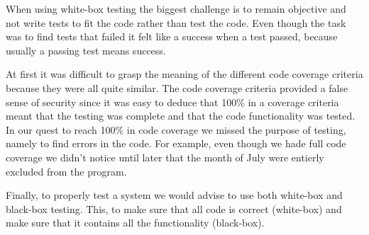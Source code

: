 When using white-box testing the biggest challenge is to remain objective and not write tests to fit the code rather than test the code. Even though the task was to find tests that failed it felt like a success when a test passed, because usually a passing test means success. 

At first it was difficult to grasp the meaning of the different code coverage criteria because they were all quite similar. The code coverage criteria provided a false sense of security since it was easy to deduce that 100\% in a coverage criteria meant that the testing was complete and that the code functionality was tested. In our quest to reach 100\% in code coverage we missed the purpose of testing, namely to find errors in the code. For example, even though we hade full code coverage we didn't notice until later that the month of July were entierly excluded from the program.

Finally, to properly test a system we would advise to use both white-box and black-box testing. This, to make sure that all code is correct (white-box) and make sure that it contains all the functionality (black-box).